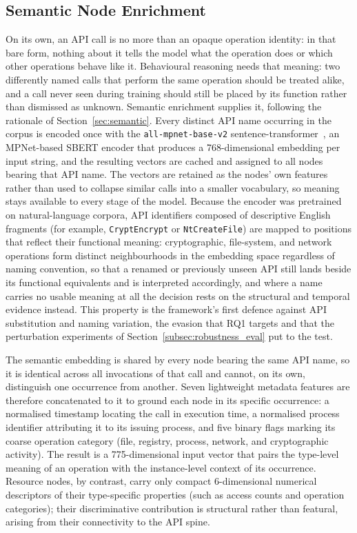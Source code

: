 \documentclass[%
    BCOR=10mm,
    DIV=13,
    toc=bibliography,
    toc=listof,
    oneside,
    12pt,
]{scrbook}
\begin{document}
\subsection{Semantic Node Enrichment}
\label{subsec:semantic_enrichment}

On its own, an API call is no more than an opaque operation identity: in that
bare form, nothing about it tells the model what the operation does or which
other operations behave like it. Behavioural reasoning needs that meaning:
two differently named calls that perform the same operation should be treated
alike, and a call never seen during training should still be placed by its
function rather than dismissed as unknown. Semantic enrichment supplies it,
following the rationale of Section~\ref{sec:semantic}. Every distinct API name
occurring in the corpus is encoded once with the \texttt{all-mpnet-base-v2}
sentence-transformer~\cite{reimers2019sbert, mpnet2020}, an MPNet-based SBERT
encoder that produces a 768-dimensional embedding per input string, and the
resulting vectors are cached and assigned to all nodes bearing that API name.
The vectors are retained as the nodes' own features rather than used to collapse
similar calls into a smaller vocabulary, so meaning stays available to every
stage of the model. Because the encoder was pretrained on natural-language
corpora, API
identifiers composed of descriptive English fragments (for example,
\texttt{CryptEncrypt} or \texttt{NtCreateFile}) are mapped to positions that
reflect their functional meaning: cryptographic, file-system, and network
operations form distinct neighbourhoods in the embedding space regardless of
naming convention, so that a renamed or previously unseen API still lands
beside its functional equivalents and is interpreted accordingly, and where a
name carries no usable meaning at all the decision rests on the structural and
temporal evidence instead. This property is the framework's first defence against API
substitution and naming variation, the evasion that RQ1 targets and that the
perturbation experiments of Section~\ref{subsec:robustness_eval} put to the
test.

The semantic embedding is shared by every node bearing the same API name, so
it is identical across all invocations of that call and cannot, on its own,
distinguish one occurrence from another. Seven lightweight metadata features
are therefore concatenated to it to ground each node in its specific
occurrence: a normalised timestamp locating the call in execution time, a
normalised process identifier attributing it to its issuing process, and five
binary flags marking its coarse operation category (file, registry, process,
network, and cryptographic activity). The result is a 775-dimensional input
vector that pairs the type-level meaning of an operation with the
instance-level context of its occurrence. Resource nodes, by contrast, carry
only compact 6-dimensional numerical descriptors of their type-specific
properties (such as access counts and operation categories); their
discriminative contribution is structural rather than featural, arising from
their connectivity to the API spine.
\end{document}
